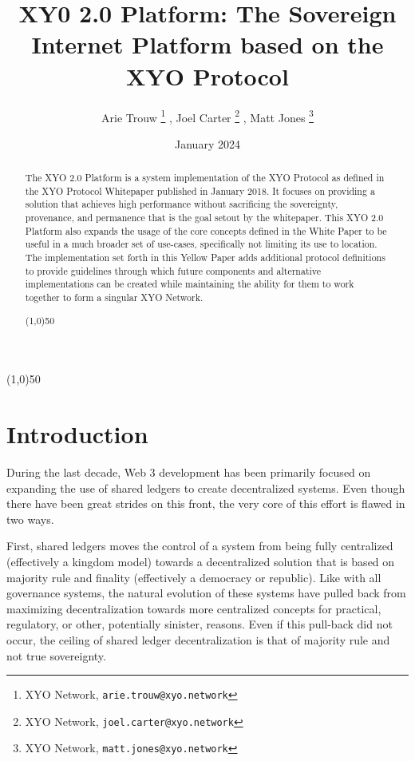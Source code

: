 \documentclass{article}
\title {XY0 2.0 Platform: The Sovereign Internet Platform based on the XYO Protocol}
\author{
    Arie Trouw
        \thanks{XYO Network, \texttt{arie.trouw@xyo.network}}
    , Joel Carter
        \thanks{XYO Network, \texttt{joel.carter@xyo.network}}
    , Matt Jones
        \thanks{XYO Network, \texttt{matt.jones@xyo.network}}
}
\date{January 2024}
\begin{document}
\pagecolor{yellow!25}
\maketitle

\begin{center}
    \line(1,0){50}
\end{center}

\begin{abstract}
    The XYO 2.0 Platform is a system implementation of the XYO Protocol as defined in the XYO Protocol Whitepaper published in January 2018.  It focuses on providing a solution that achieves high performance without sacrificing the sovereignty, provenance, and permanence that is the goal setout by the whitepaper.  This XYO 2.0 Platform also expands the usage of the core concepts defined in the White Paper to be useful in a much broader set of use-cases, specifically not limiting its use to location.  The implementation set forth in this Yellow Paper adds additional protocol definitions to provide guidelines through which future components and alternative implementations can be created while maintaining the ability for them to work together to form a singular XYO Network.
    \begin{center}
        \line(1,0){50}
    \end{center}
\end{abstract}

\clearpage

\tableofcontents

\clearpage

\section{Introduction}
During the last decade, Web 3 development has been primarily focused on expanding the use of shared ledgers to create decentralized systems.  Even though there have been great strides on this front, the very core of this effort is flawed in two ways.

First, shared ledgers moves the control of a system from being fully centralized (effectively a kingdom model) towards a decentralized solution that is based on majority rule and finality (effectively a democracy or republic).  Like with all governance systems, the natural evolution of these systems have pulled back from maximizing decentralization towards more centralized concepts for practical, regulatory, or other, potentially sinister, reasons.  Even if this pull-back did not occur, the ceiling of shared ledger decentralization is that of majority rule and not true sovereignty.
\end{document}
